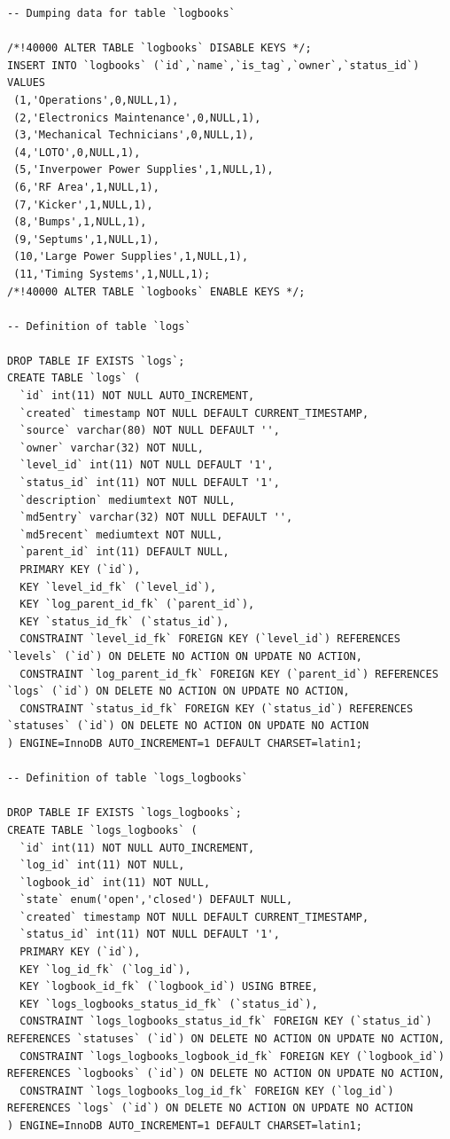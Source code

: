 \documentclass[11pt
  , a4paper
  , article
  , oneside
]{memoir}
\begin{document}
\begin{lstlisting}[style=termstylenumber, caption={olog\_schema.sql}, label={list:nfsroot-file}]
-- Dumping data for table `logbooks`

/*!40000 ALTER TABLE `logbooks` DISABLE KEYS */;
INSERT INTO `logbooks` (`id`,`name`,`is_tag`,`owner`,`status_id`) VALUES
 (1,'Operations',0,NULL,1),
 (2,'Electronics Maintenance',0,NULL,1),
 (3,'Mechanical Technicians',0,NULL,1),
 (4,'LOTO',0,NULL,1),
 (5,'Inverpower Power Supplies',1,NULL,1),
 (6,'RF Area',1,NULL,1),
 (7,'Kicker',1,NULL,1),
 (8,'Bumps',1,NULL,1),
 (9,'Septums',1,NULL,1),
 (10,'Large Power Supplies',1,NULL,1),
 (11,'Timing Systems',1,NULL,1);
/*!40000 ALTER TABLE `logbooks` ENABLE KEYS */;

-- Definition of table `logs`

DROP TABLE IF EXISTS `logs`;
CREATE TABLE `logs` (
  `id` int(11) NOT NULL AUTO_INCREMENT,
  `created` timestamp NOT NULL DEFAULT CURRENT_TIMESTAMP,
  `source` varchar(80) NOT NULL DEFAULT '',
  `owner` varchar(32) NOT NULL,
  `level_id` int(11) NOT NULL DEFAULT '1',
  `status_id` int(11) NOT NULL DEFAULT '1',
  `description` mediumtext NOT NULL,
  `md5entry` varchar(32) NOT NULL DEFAULT '',
  `md5recent` mediumtext NOT NULL,
  `parent_id` int(11) DEFAULT NULL,
  PRIMARY KEY (`id`),
  KEY `level_id_fk` (`level_id`),
  KEY `log_parent_id_fk` (`parent_id`),
  KEY `status_id_fk` (`status_id`),
  CONSTRAINT `level_id_fk` FOREIGN KEY (`level_id`) REFERENCES `levels` (`id`) ON DELETE NO ACTION ON UPDATE NO ACTION,
  CONSTRAINT `log_parent_id_fk` FOREIGN KEY (`parent_id`) REFERENCES `logs` (`id`) ON DELETE NO ACTION ON UPDATE NO ACTION,
  CONSTRAINT `status_id_fk` FOREIGN KEY (`status_id`) REFERENCES `statuses` (`id`) ON DELETE NO ACTION ON UPDATE NO ACTION
) ENGINE=InnoDB AUTO_INCREMENT=1 DEFAULT CHARSET=latin1;

-- Definition of table `logs_logbooks`

DROP TABLE IF EXISTS `logs_logbooks`;
CREATE TABLE `logs_logbooks` (
  `id` int(11) NOT NULL AUTO_INCREMENT,
  `log_id` int(11) NOT NULL,
  `logbook_id` int(11) NOT NULL,
  `state` enum('open','closed') DEFAULT NULL,
  `created` timestamp NOT NULL DEFAULT CURRENT_TIMESTAMP,
  `status_id` int(11) NOT NULL DEFAULT '1',
  PRIMARY KEY (`id`),
  KEY `log_id_fk` (`log_id`),
  KEY `logbook_id_fk` (`logbook_id`) USING BTREE,
  KEY `logs_logbooks_status_id_fk` (`status_id`),
  CONSTRAINT `logs_logbooks_status_id_fk` FOREIGN KEY (`status_id`) REFERENCES `statuses` (`id`) ON DELETE NO ACTION ON UPDATE NO ACTION,
  CONSTRAINT `logs_logbooks_logbook_id_fk` FOREIGN KEY (`logbook_id`) REFERENCES `logbooks` (`id`) ON DELETE NO ACTION ON UPDATE NO ACTION,
  CONSTRAINT `logs_logbooks_log_id_fk` FOREIGN KEY (`log_id`) REFERENCES `logs` (`id`) ON DELETE NO ACTION ON UPDATE NO ACTION
) ENGINE=InnoDB AUTO_INCREMENT=1 DEFAULT CHARSET=latin1;


\end{lstlisting}
\end{document}
